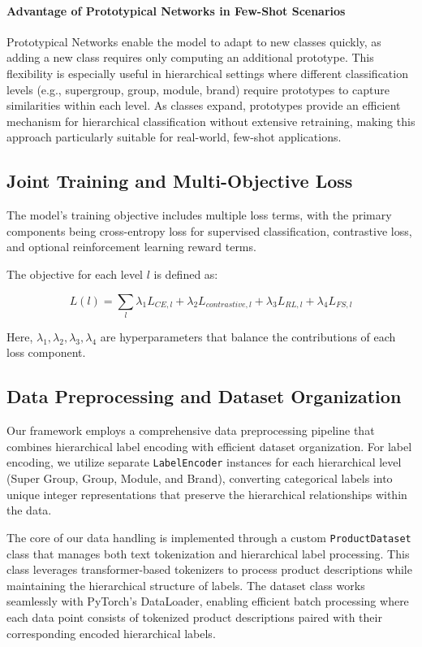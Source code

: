 \documentclass[9pt,a4paper,twoside]{rho-class/rho}
\begin{document}
\paragraph{Advantage of Prototypical Networks in Few-Shot Scenarios}
Prototypical Networks enable the model to adapt to new classes quickly, as adding a new class requires only computing an additional prototype. This flexibility is especially useful in hierarchical settings where different classification levels (e.g., supergroup, group, module, brand) require prototypes to capture similarities within each level. As classes expand, prototypes provide an efficient mechanism for hierarchical classification without extensive retraining, making this approach particularly suitable for real-world, few-shot applications.

        
    \subsection{Joint Training and Multi-Objective Loss}

The model’s training objective includes multiple loss terms, with the primary components being cross-entropy loss for supervised classification, contrastive loss, and optional reinforcement learning reward terms.

The objective for each level \( l \) is defined as:

\[ \label{eq:level_loss}
L(l) = \sum_{l} \lambda_1 L_{CE, l} + \lambda_2 L_{contrastive, l} + \lambda_3 L_{RL, l} + \lambda_4 L_{FS, l}
\]

Here, \( \lambda_1, \lambda_2, \lambda_3, \lambda_4 \) are hyperparameters that balance the contributions of each loss component.
        
    \subsection{Data Preprocessing and Dataset Organization}

       Our framework employs a comprehensive data preprocessing pipeline that combines hierarchical label encoding with efficient dataset organization. For label encoding, we utilize separate \verb|LabelEncoder| instances for each hierarchical level (Super Group, Group, Module, and Brand), converting categorical labels into unique integer representations that preserve the hierarchical relationships within the data.

The core of our data handling is implemented through a custom \verb|ProductDataset| class that manages both text tokenization and hierarchical label processing. This class leverages transformer-based tokenizers to process product descriptions while maintaining the hierarchical structure of labels. The dataset class works seamlessly with PyTorch's DataLoader, enabling efficient batch processing where each data point consists of tokenized product descriptions paired with their corresponding encoded hierarchical labels.
\end{document}
